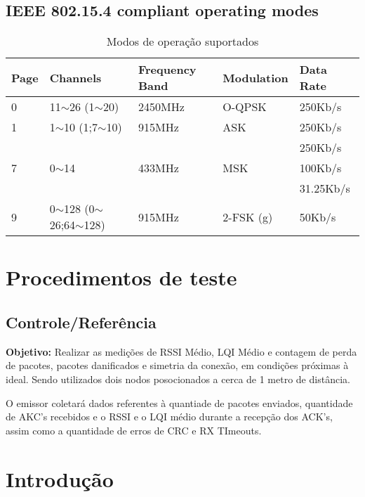 \documentclass{article}
\begin{document}
\subsection{IEEE 802.15.4 compliant operating modes}
\begin{table}[h]
\centering
\begin{tabular}{|l|l|l|l|l|}
\hline
\textbf{Page}      & \textbf{Channels}          & \textbf{Frequency Band} & \textbf{Modulation}  & \textbf{Data Rate} \\ \hline
0                  & 11$\sim$26 (1$\sim$20)     & 2450MHz                 & O-QPSK               & 250Kb/s            \\ \hline
1                  & 1$\sim$10  (1;7$\sim$10)   & 915MHz                  & ASK                  & 250Kb/s            \\ \hline
\multirow{3}{*}{7} & \multirow{3}{*}{0$\sim$14} & \multirow{3}{*}{433MHz} & \multirow{3}{*}{MSK} & 250Kb/s            \\ \cline{5-5} 
                   &                            &                         &                      & 100Kb/s            \\ \cline{5-5} 
                   &                            &                         &                      & 31.25Kb/s          \\ \hline
9                  & 0$\sim$128 (0$\sim$26;64$\sim$128)   & 915MHz        & 2-FSK (g)            & 50Kb/s             \\ \hline
\end{tabular}
\caption{Modos de operação suportados}
\label{my-label}
\end{table}

\clearpage
\section{Procedimentos de teste}
\subsection{Controle/Referência}
\textbf{Objetivo:} Realizar as medições de RSSI Médio, LQI Médio e contagem de perda de pacotes, pacotes danificados e simetria da conexão, em condições próximas à ideal. Sendo utilizados dois nodos posocionados a cerca de 1 metro de distância.

O emissor coletará dados referentes à quantiade de pacotes enviados, quantidade de AKC's recebidos e o RSSI e o LQI médio durante a recepção dos ACK's, assim como a quantidade de erros de CRC e RX TImeouts.
\clearpage
\section{Introdução}
\end{document}
